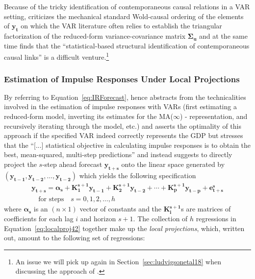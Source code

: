 \documentclass[a4paper,11pt,listof=nochaptergap,oneside,pointednumbers,bibtotoc,bigheadings,liststotoc]{scrbook}
\theoremstyle{mysatz}
\theoremstyle{mydefinition}
\theoremstyle{mybemerkung}
\renewcommand*{\paragraph}[1]{\subsubsection*{#1} \vspace{-3mm}} %
\newcommand{\vect}[1]{\boldsymbol{\mathbf{#1}}}
\begin{document}
\begin{itemize}
\\
\\
Because of the tricky identification of contemporaneous causal relations in a VAR setting, \citet{jorda:05} criticizes the mechanical standard Wold-causal ordering of the elements of $\vect{y_t}$ on which the VAR literature often relies to establish the triangular factorization of the reduced-form variance-covariance matrix $\vect{\Sigma_u}$ and at the same time finds that the ``statistical-based structural identification of contemporaneous causal links'' is a difficult venture.\footnote{An issue we will pick up again in Section~\ref{sec:ludvigsonetal18} when discussing the approach of \citet{ludvigsonetal:18}.}

\paragraph{Estimation of Impulse Responses Under Local Projections}
By referring to Equation~\ref{eq:IRForecast}, \citet[p. 4]{jorda:05} hence abstracts from the technicalities involved in the estimation of impulse responses with VARs (first estimating a reduced-form model, inverting its estimates for the MA($\infty$) - representation, and recursively iterating through the model, etc.) and asserts the optimality of this approach if the specified VAR indeed correctly represents the GDP but stresses that the ``[...] statistical objective in calculating impulse responses is to obtain the best, mean-squared, multi-step predictions'' and instead suggests to directly project the $s$-step ahead forecast $\vect{y_{t+s}}$ onto the linear space generated by $(\vect{y_{t-1}}, \vect{y_{t-2}}, \dots, \vect{y_{t-2}})$ which yields the following specification
\begin{equation} \label{eq:localproj42}
\begin{split}
	\vect{y_{t+s}} = \vect{\alpha_s} + \vect{K_1^{s+1}}\vect{y_{t-1}} + \vect{K_2^{s+1}}\vect{y_{t-2}} + \cdots + \vect{K_p^{s+1}}\vect{y_{t-p}} + \vect{e_{t+s}^s} \\
	\quad \text{for steps} \quad s=0, 1, 2, \dots, h 
\end{split}								
\end{equation}
where $\vect{\alpha_s}$ is an $(n \times 1)$ vector of constants and the $\vect{K_i^{s+1}}$s are matrices of coefficients for each lag $i$ and horizon $s+1$. The collection of $h$ regressions in Equation~\ref{eq:localproj42} together make up the \textit{local projections}, which, written out, amount to the following set of regressions:

\end{itemize}
\end{document}
